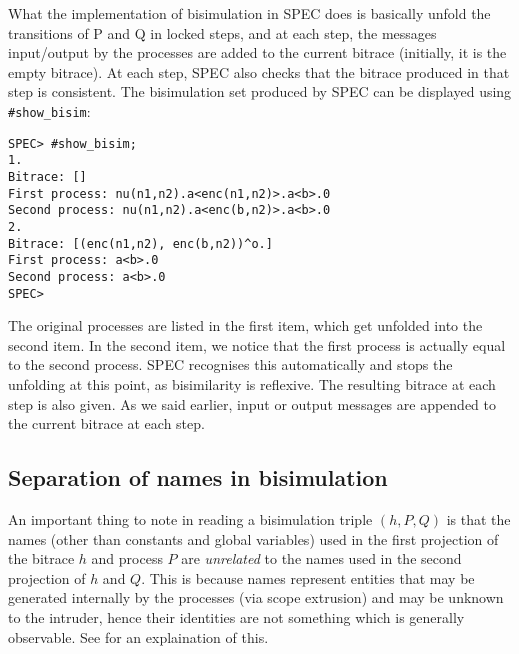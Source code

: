 \documentclass{article}
\begin{document}
What the implementation of bisimulation in SPEC does is basically
unfold the transitions of P and Q in locked steps, and at each step, the 
messages input/output by the processes are added to the current bitrace (initially,
it is the empty bitrace). At each step, SPEC also checks that the bitrace produced
in that step is consistent. 
The bisimulation set produced by SPEC can be displayed using \texttt{\#show\_bisim}:
\begin{verbatim}
SPEC> #show_bisim;
1. 
Bitrace: []
First process: nu(n1,n2).a<enc(n1,n2)>.a<b>.0
Second process: nu(n1,n2).a<enc(b,n2)>.a<b>.0
2. 
Bitrace: [(enc(n1,n2), enc(b,n2))^o.]
First process: a<b>.0
Second process: a<b>.0
SPEC>
\end{verbatim}
The original processes are listed in the first item, which get unfolded into the second
item. In the second item, we notice that the first process is actually equal to the second
process. SPEC recognises this automatically and stops the unfolding at this point, as 
bisimilarity is reflexive. 
The resulting bitrace at each step is also given.
As we said earlier, input or output messages are appended to the current bitrace at each
step. 

\subsection{Separation of names in bisimulation}

An important thing to note in reading a bisimulation triple $(h,P,Q)$ is that
the names (other than constants and global variables) used in the first projection of the bitrace $h$
and process $P$ are {\em unrelated} to the names used in the second projection of $h$
and $Q$. This is because names represent entities that may be generated internally
by the processes (via scope extrusion) and may be unknown to the intruder, hence their
identities are not something which is generally observable. 
See \cite{abadi98njc} for an explaination of this. 
\end{document}
